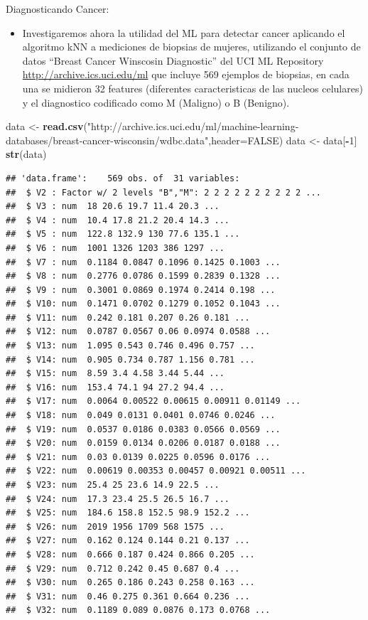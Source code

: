 \documentclass[ignorenonframetext,]{beamer}
\newenvironment{Shaded}{\begin{snugshade}}{\end{snugshade}}
\newcommand{\KeywordTok}[1]{\textcolor[rgb]{0.13,0.29,0.53}{\textbf{#1}}}
\newcommand{\DataTypeTok}[1]{\textcolor[rgb]{0.13,0.29,0.53}{#1}}
\newcommand{\DecValTok}[1]{\textcolor[rgb]{0.00,0.00,0.81}{#1}}
\newcommand{\StringTok}[1]{\textcolor[rgb]{0.31,0.60,0.02}{#1}}
\newcommand{\OtherTok}[1]{\textcolor[rgb]{0.56,0.35,0.01}{#1}}
\newcommand{\OperatorTok}[1]{\textcolor[rgb]{0.81,0.36,0.00}{\textbf{#1}}}
\newcommand{\NormalTok}[1]{#1}
\providecommand{\tightlist}{%
  \setlength{\itemsep}{0pt}\setlength{\parskip}{0pt}}
\begin{document}
\begin{frame}[fragile]

\begin{block}{Diagnosticando Cancer:}

\begin{itemize}
\tightlist
\item
  Investigaremos ahora la utilidad del ML para detectar cancer aplicando
  el algoritmo kNN a mediciones de biopsias de mujeres, utilizando el
  conjunto de datos ``Breast Cancer Winscosin Diagnostic'' del UCI ML
  Repository \url{http://archive.ics.uci.edu/ml} que incluye 569
  ejemplos de biopsias, en cada una se midieron 32 features (diferentes
  caracteristicas de las nucleos celulares) y el diagnostico codificado
  como M (Maligno) o B (Benigno).
\end{itemize}

\begin{Shaded}
\begin{Highlighting}[]
\NormalTok{data <-}\StringTok{ }\KeywordTok{read.csv}\NormalTok{(}\StringTok{"http://archive.ics.uci.edu/ml/machine-learning-databases/breast-cancer-wisconsin/wdbc.data"}\NormalTok{,}\DataTypeTok{header=}\OtherTok{FALSE}\NormalTok{)}
\NormalTok{data <-}\StringTok{ }\NormalTok{data[}\OperatorTok{-}\DecValTok{1}\NormalTok{]}
\KeywordTok{str}\NormalTok{(data)}
\end{Highlighting}
\end{Shaded}

\begin{verbatim}
## 'data.frame':    569 obs. of  31 variables:
##  $ V2 : Factor w/ 2 levels "B","M": 2 2 2 2 2 2 2 2 2 2 ...
##  $ V3 : num  18 20.6 19.7 11.4 20.3 ...
##  $ V4 : num  10.4 17.8 21.2 20.4 14.3 ...
##  $ V5 : num  122.8 132.9 130 77.6 135.1 ...
##  $ V6 : num  1001 1326 1203 386 1297 ...
##  $ V7 : num  0.1184 0.0847 0.1096 0.1425 0.1003 ...
##  $ V8 : num  0.2776 0.0786 0.1599 0.2839 0.1328 ...
##  $ V9 : num  0.3001 0.0869 0.1974 0.2414 0.198 ...
##  $ V10: num  0.1471 0.0702 0.1279 0.1052 0.1043 ...
##  $ V11: num  0.242 0.181 0.207 0.26 0.181 ...
##  $ V12: num  0.0787 0.0567 0.06 0.0974 0.0588 ...
##  $ V13: num  1.095 0.543 0.746 0.496 0.757 ...
##  $ V14: num  0.905 0.734 0.787 1.156 0.781 ...
##  $ V15: num  8.59 3.4 4.58 3.44 5.44 ...
##  $ V16: num  153.4 74.1 94 27.2 94.4 ...
##  $ V17: num  0.0064 0.00522 0.00615 0.00911 0.01149 ...
##  $ V18: num  0.049 0.0131 0.0401 0.0746 0.0246 ...
##  $ V19: num  0.0537 0.0186 0.0383 0.0566 0.0569 ...
##  $ V20: num  0.0159 0.0134 0.0206 0.0187 0.0188 ...
##  $ V21: num  0.03 0.0139 0.0225 0.0596 0.0176 ...
##  $ V22: num  0.00619 0.00353 0.00457 0.00921 0.00511 ...
##  $ V23: num  25.4 25 23.6 14.9 22.5 ...
##  $ V24: num  17.3 23.4 25.5 26.5 16.7 ...
##  $ V25: num  184.6 158.8 152.5 98.9 152.2 ...
##  $ V26: num  2019 1956 1709 568 1575 ...
##  $ V27: num  0.162 0.124 0.144 0.21 0.137 ...
##  $ V28: num  0.666 0.187 0.424 0.866 0.205 ...
##  $ V29: num  0.712 0.242 0.45 0.687 0.4 ...
##  $ V30: num  0.265 0.186 0.243 0.258 0.163 ...
##  $ V31: num  0.46 0.275 0.361 0.664 0.236 ...
##  $ V32: num  0.1189 0.089 0.0876 0.173 0.0768 ...
\end{verbatim}


\end{block}
\end{frame}
\end{document}
